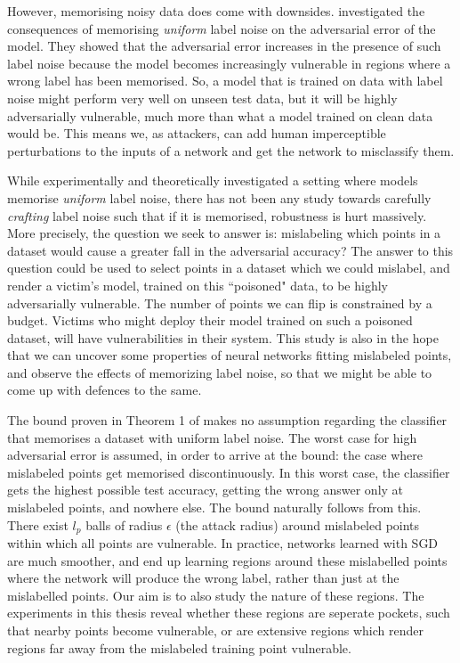 \documentclass{ociamthesis}
\begin{document}
However, memorising noisy data does come with downsides. \citet{sanyal2021how}
investigated the consequences of memorising \emph{uniform} label noise on the
adversarial error of the model. They showed that the adversarial error increases
in the presence of such label noise because the model becomes increasingly
vulnerable in regions where a wrong label has been memorised. So, a model that
is trained on data with label noise might perform very well on unseen test data,
but it will be highly adversarially vulnerable, much more than what a model
trained on clean data would be. This means we, as attackers, can add human
imperceptible perturbations to the inputs of a network and get the network to
misclassify them.

While \citet{sanyal2021how} experimentally and theoretically investigated a
setting where models memorise \emph{uniform} label noise, there has not been any
study towards carefully \emph{crafting} label noise such that if it is
memorised, robustness is hurt massively. More precisely, the question we seek to
answer is: mislabeling which points in a dataset would cause a greater fall in
the adversarial accuracy? The answer to this question could be used to select
points in a dataset which we could mislabel, and render a victim's model,
trained on this ``poisoned" data, to be highly adversarially vulnerable. The
number of points we can flip is constrained by a budget. Victims who might
deploy their model trained on such a poisoned dataset, will have vulnerabilities
in their system. This study is also in the hope that we can uncover some
properties of neural networks fitting mislabeled points, and observe the effects
of memorizing label noise, so that we might be able to come up with defences to
the same.

The bound proven in Theorem 1 of \citet{sanyal2021how} makes no assumption
regarding the classifier that memorises a dataset with uniform label noise. The
worst case for high adversarial error is assumed, in order to arrive at the
bound: the case where mislabeled points get memorised discontinuously. In this
worst case, the classifier gets the highest possible test accuracy, getting the
wrong answer only at mislabeled points, and nowhere else. The bound naturally
follows from this. There exist $l_p$ balls of radius $\epsilon$ (the attack
radius) around mislabeled points within which all points are vulnerable. In
practice, networks learned with SGD are much smoother, and end up learning
regions around these mislabelled points where the network will produce the wrong
label, rather than just at the mislabelled points. Our aim is to also study the
nature of these regions. The experiments in this thesis reveal whether these
regions are seperate pockets, such that nearby points become vulnerable, or are
extensive regions which render regions far away from the mislabeled training
point vulnerable.
\end{document}
